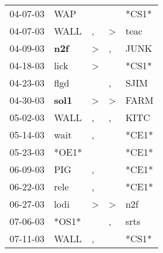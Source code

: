 \begin{supertabular}{p{0.07\textwidth}p{0.06\textwidth}p{0.02\textwidth}p{0.02\textwidth}p{0.06\textwidth}}
          04-07-03\textsuperscript{} &            WAP\textsuperscript{} &                  &                  &                            *CS1* \\
          04-07-03\textsuperscript{} &           WALL\textsuperscript{} &                , &     \textgreater &           teac\textsuperscript{} \\
          04-09-03\textsuperscript{} &   \textbf{n2f\textsuperscript{}} &     \textgreater &                , &           JUNK\textsuperscript{} \\
          04-18-03\textsuperscript{} &           lick\textsuperscript{} &     \textgreater &                  &                            *CS1* \\
          04-23-03\textsuperscript{} &           flgd\textsuperscript{} &                  &                , &           SJIM\textsuperscript{} \\
          04-30-03\textsuperscript{} &  \textbf{sol1\textsuperscript{}} &     \textgreater &     \textgreater &           FARM\textsuperscript{} \\
          05-02-03\textsuperscript{} &           WALL\textsuperscript{} &                , &                , &           KITC\textsuperscript{} \\
          05-14-03\textsuperscript{} &           wait\textsuperscript{} &                , &                  &                            *CE1* \\
          05-23-03\textsuperscript{} &                            *OE1* &                  &                  &                            *CE1* \\
          06-09-03\textsuperscript{} &            PIG\textsuperscript{} &                , &                  &                            *CE1* \\
          06-22-03\textsuperscript{} &           rele\textsuperscript{} &                , &                  &                            *CE1* \\
          06-27-03\textsuperscript{} &           lodi\textsuperscript{} &     \textgreater &     \textgreater &            n2f\textsuperscript{} \\
          07-06-03\textsuperscript{} &                            *OS1* &                  &                , &           srts\textsuperscript{} \\
          07-11-03\textsuperscript{} &           WALL\textsuperscript{} &                , &                  &                            *CS1* \\

\end{supertabular}
